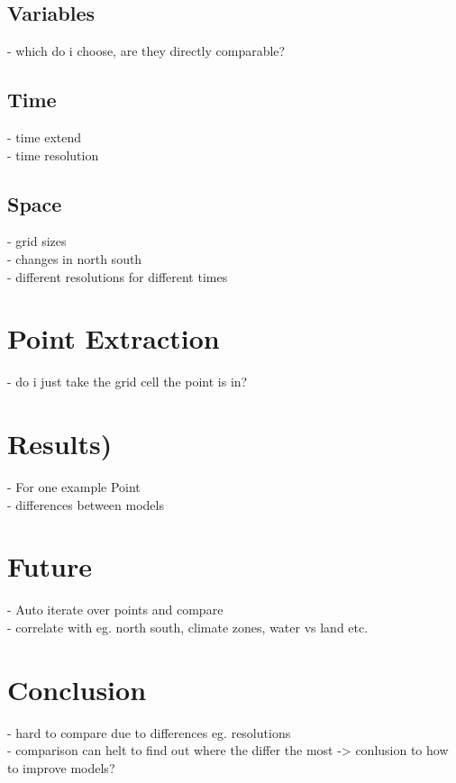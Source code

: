 \documentclass[12pt]{scrartcl}
\begin{document}
\subsection{Variables}
- which do i choose, are they directly comparable? \\

\subsection{Time}
- time extend \\
- time resolution \\

\subsection{Space}
- grid sizes \\
- changes in north south \\
- different resolutions for different times \\

\section{Point Extraction}
- do i just take the grid cell the point is in? \\

\section{Results)}
- For one example Point \\
- differences between models \\

\section{Future}
- Auto iterate over points and compare \\
- correlate with eg. north south, climate zones, water vs land etc. \\


\section{Conclusion}
- hard to compare due to differences eg. resolutions \\
- comparison can helt to find out where the differ the most -> conlusion to how to improve models? \\



\newpage
\pagestyle{empty}
\printbibliography
\end{document}
